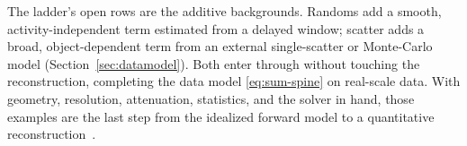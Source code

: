 The ladder's open rows are the additive backgrounds. Randoms add a smooth,
activity-independent term estimated from a delayed window; scatter adds a broad,
object-dependent term from an external single-scatter or Monte-Carlo model
(Section~\ref{sec:datamodel}). Both enter through  without
touching the reconstruction, completing the data model \eqref{eq:sum-spine} on
real-scale data. With geometry, resolution, attenuation, statistics, and the
solver in hand, those examples are the last step from the idealized forward model
to a quantitative reconstruction~\cite{crysp2026}.
